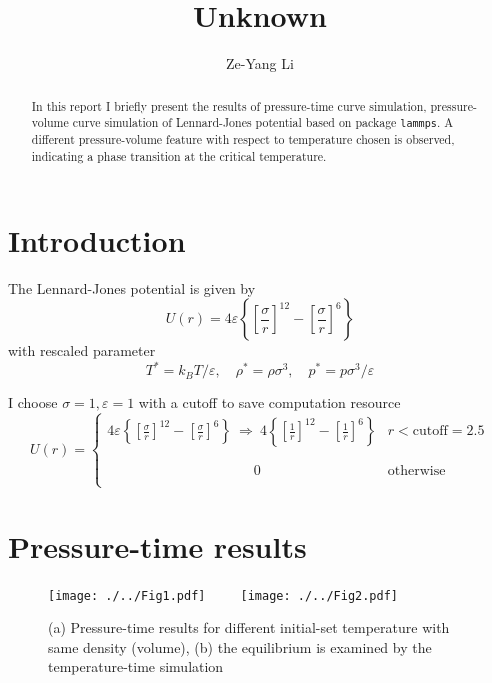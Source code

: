 \documentclass[aps,pra]{revtex4}   	%
\begin{document}
\title{%
Unknown}
\author{Ze-Yang Li}
\begin{abstract}
In this report I briefly present the results of pressure-time curve simulation, pressure-volume curve simulation of Lennard-Jones potential based on package \texttt{lammps}\cite{plimpton1995fast}. A different pressure-volume feature with respect to temperature chosen is observed, indicating a phase transition at the critical temperature. 
\end{abstract}
\maketitle
\section{Introduction}

The Lennard-Jones potential is given by
\[U(r) = 4\varepsilon\left\{\left[\frac{\sigma}{r}\right]^{12}-\left[\frac{\sigma}{r}\right]^{6}\right\} \]
with rescaled parameter
\[T^* = k_BT/\varepsilon,\quad \rho^*=\rho\sigma^3,\quad p^*=p\sigma^3/\varepsilon \]

I choose $\sigma=1, \varepsilon=1$ with a cutoff to save computation resource
\[U(r) = \begin{cases}4\varepsilon\left\{\left[\displaystyle\frac{\sigma}{r}\right]^{12}-\left[\displaystyle\frac{\sigma}{r}\right]^{6}\right\}\ \Longrightarrow\ 4\left\{\left[\displaystyle\frac{1}{r}\right]^{12}-\left[\displaystyle\frac{1}{r}\right]^{6}\right\} & r<\text{cutoff}=2.5\\ & \\ \phantom{\to4\varepsilon\left\{\left[\displaystyle\frac{\sigma}{r}\right]^{12}-\left[\displaystyle\frac{\sigma}{r}\right]^{6}\right\}}0 &\text{otherwise}\end{cases} \]

\section{Pressure-time results}
\begin{figure}[h]
\begin{center}
\texttt{[image: ./../Fig1.pdf]}\ \ \ \ \ 
\texttt{[image: ./../Fig2.pdf]}
\end{center}
\caption{(a) Pressure-time results for different initial-set temperature with same density (volume), (b) the equilibrium is examined by the temperature-time simulation}\label{Fig1}
\end{figure}
\end{document}
